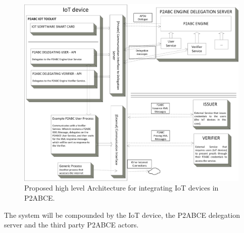 \begin{figure}[bth]
	\begin{center}
		\includegraphics[width=\linewidth]{gfx/P2ABCE-IoT-bw}
	\end{center}
	\caption{Proposed high level Architecture for integrating IoT devices in P2ABCE.}
	\label{fig:P2ABCE-IoT}
\end{figure}


\hfil


The system will be compounded by the IoT device, the P2ABCE delegation server and the third party P2ABCE actors.

